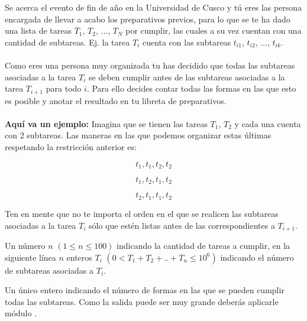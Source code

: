 
Se acerca el evento de fin de año en la Universidad de Cusco y tú eres las persona encargada de llevar a acabo los preparativos previos, para lo que se te ha dado una lista de tareas $T_1$, $T_2$, ..., $T_N$ por cumplir, las cuales a su vez cuentan con una cantidad de subtareas. Ej. la tarea $T_i$ cuenta con las subtareas $t_{i1}$, $t_{i2}$, ..., $t_{ik}$.\\\\

Como eres una persona muy organizada tu has decidido que todas las subtareas asociadas a la tarea $T_i$ se deben cumplir antes de las subtareas asociadas a la tarea $T_{i+1}$ para todo $i$. Para ello decides contar todas las formas en las que esto es posible y anotar el resultado en tu libreta de preparativos.\\\\

\textbf{Aquí va un ejemplo:} Imagina que se tienen las tareas $T_1$, $T_2$ y cada una cuenta con 2 subtareas.
Las maneras en las que podemos organizar estas últimas respetando la restricción anterior es:

$$t_{1}, t_{1}, t_{2}, t_{2}$$

$$t_{1}, t_{2}, t_{1}, t_{2}$$

$$t_{2}, t_{1}, t_{1}, t_{2}$$

Ten en mente que no te importa el orden en el que se realicen las subtareas asociadas a la tarea $T_i$ sólo que estén listas antes de las correspondientes a $T_{i+1}$.


Un número $n$ $(1 \leq n \leq 100)$ indicando la cantidad de tareas a cumplir, en la siguiente línea $n$ enteros  $T_i$ $(0 < T_1 + T_2 + .. + T_n \leq 10^6)$ indicando el número de subtareas asociadas a $T_i$.

\outputText

Un único entero indicando el número de formas en las que se pueden cumplir todas las subtareas. Como la salida puede ser muy grande deberás aplicarle módulo .

\exampleCases

\begin{example}
\end{example}
